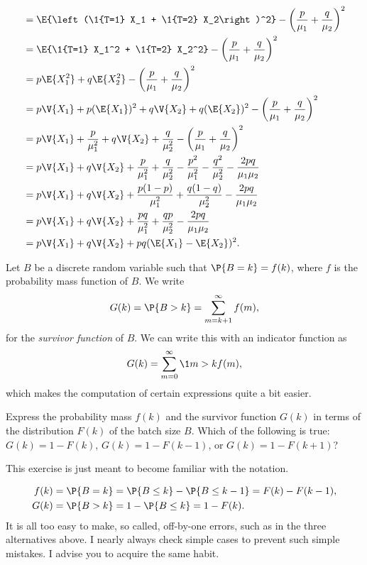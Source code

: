 \begin{exercise}
\begin{solution}
\begin{align*}
&= \E{\left(\1{T=1} X_1 + \1{T=2} X_2\right)^2} - \left(\frac{p}{\mu_1}+\frac{q}{\mu_2}\right)^2 \\
&= \E{\1{T=1} X_1^2 + \1{T=2} X_2^2} - \left(\frac{p}{\mu_1}+\frac{q}{\mu_2}\right)^2 \\ 
&= p \E{X_1^2} + q \E{X_2^2} - \left(\frac{p}{\mu_1}+\frac{q}{\mu_2}\right)^2 \\ 
&= p \V{X_1} + p (\E{X_1})^2 + q \V{X_2} + q(\E{ X_2})^2 - \left(\frac{p}{\mu_1}+\frac{q}{\mu_2}\right)^2 \\ 
&= p \V{X_1} + \frac{p}{\mu_1^2} + q \V{X_2} + \frac{q}{\mu_2^2} - \left(\frac{p}{\mu_1}+\frac{q}{\mu_2}\right)^2 \\ 
&= p \V{X_1} + q \V{X_2}
+ \frac{p}{\mu_1^2} + \frac{q}{\mu_2^2}
- \frac{p^2}{\mu_1^2}-\frac{q^2}{\mu_2^2}  -\frac{2pq}{\mu_1\mu_2}\\ 
&= p \V{X_1} + q \V{X_2}
+ \frac{p(1-p)}{\mu_1^2} + \frac{q(1-q)}{\mu_2^2}
-\frac{2pq}{\mu_1\mu_2}\\ 
&= p \V{X_1} + q \V{X_2}
+ \frac{pq}{\mu_1^2} + \frac{qp}{\mu_2^2}
-\frac{2pq}{\mu_1\mu_2}\\ 
&= p \V{X_1} + q \V{X_2}
+ pq(\E{X_1} - \E{X_2})^2.
\end{align*}
\end{solution}
\end{exercise}


Let $B$ be a discrete random variable such that $\P{B = k} = f(k)$, where $f$ is the probability mass function of $B$. We write
\begin{equation*}
  G(k) = \P{B>k} = \sum_{m=k+1}^\infty f(m),
\end{equation*}
for the \emph{survivor function} of $B$.  We can write this with an indicator function as
\begin{equation*}
  G(k) = \sum_{m=0}^\infty \1{m>k} f(m),
\end{equation*}
which makes the computation of certain expressions quite a bit easier. 

\begin{exercise}\label{ex:5}
  Express the probability mass  $f(k)$ and the survivor function $G(k)$ in terms of the distribution $F(k)$ of the batch size $B$. Which of the following is true:
  $G(k) = 1-F(k)$, $G(k) = 1-F(k-1)$, or $G(k) = 1-F(k+1)$?
  \begin{hint}
This exercise is just meant to become familiar with the notation.
  \end{hint}
  \begin{solution}
    \begin{align*}
    f(k) &= \P{B=k} = \P{B\leq k} - \P{B\leq k-1} = F(k)-F(k-1), \\
    G(k) &= \P{B>k} = 1 - \P{B\leq k} = 1-F(k).        
    \end{align*}
    It is all too easy to make, so called, off-by-one errors, such as
    in the three alternatives above.  I nearly always check simple
    cases to prevent such simple mistakes. I advise you to acquire the
    same habit.
  \end{solution}
\end{exercise}


